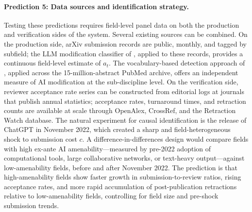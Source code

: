 \documentclass{article}
\begin{document}
\paragraph{Prediction 5: Data sources and identification strategy.}
Testing these predictions requires field-level panel data on both the production and verification sides of the system.
Several existing sources can be combined.
On the production side, arXiv submission records are public, monthly, and tagged by subfield; the LLM modification classifier of \citet{Liang2025}, applied to these records, provides a continuous field-level estimate of $a_t$.
The vocabulary-based detection approach of \citet{Kobak2025}, applied across the 15-million-abstract PubMed archive, offers an independent measure of AI modification at the sub-discipline level.
On the verification side, reviewer acceptance rate series can be constructed from editorial logs at journals that publish annual statistics; acceptance rates, turnaround times, and retraction counts are available at scale through OpenAlex, CrossRef, and the Retraction Watch database.
The natural experiment for causal identification is the release of ChatGPT in November 2022, which created a sharp and field-heterogeneous shock to submission cost $c$.
A difference-in-differences design would compare fields with high ex-ante AI amenability---measured by pre-2022 adoption of computational tools, large collaborative networks, or text-heavy output---against low-amenability fields, before and after November 2022.
The prediction is that high-amenability fields show faster growth in submission-to-review ratios, rising acceptance rates, and more rapid accumulation of post-publication retractions relative to low-amenability fields, controlling for field size and pre-shock submission trends.
\end{document}
